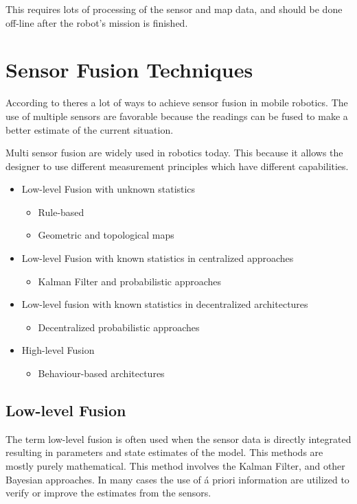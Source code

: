 This requires lots of processing of the sensor and map data, and should be done off-line
after the robot's mission is finished. 


\section{Sensor Fusion Techniques}
According to \cite{sensor-fusion-mobile-robots} theres a lot of ways to achieve sensor
fusion in mobile robotics. The use of multiple sensors are favorable because the readings
can be fused to make a better estimate of the current situation. 

Multi sensor fusion are widely used in robotics today. This because it allows the designer
to use different measurement principles which have different capabilities. 


\begin{itemize}
    \item Low-level Fusion with unknown statistics
        \begin{itemize}
            \item Rule-based
            \item Geometric and topological maps
        \end{itemize}
    \item Low-level Fusion with known statistics in centralized approaches
        \begin{itemize}
            \item Kalman Filter and probabilistic approaches
        \end{itemize}
    \item Low-level fusion with known statistics in decentralized architectures
        \begin{itemize}
            \item Decentralized probabilistic approaches
        \end{itemize}
    \item High-level Fusion
        \begin{itemize}
            \item Behaviour-based architectures
        \end{itemize}
\end{itemize}


\subsection{Low-level Fusion}
The term low-level fusion is often used when the sensor data is directly integrated
resulting in parameters and state estimates of the model. This methods are mostly purely
mathematical. This method involves the Kalman Filter, and other Bayesian approaches. In
many cases the use of \'a priori information are utilized to verify or improve the
estimates from the sensors.

